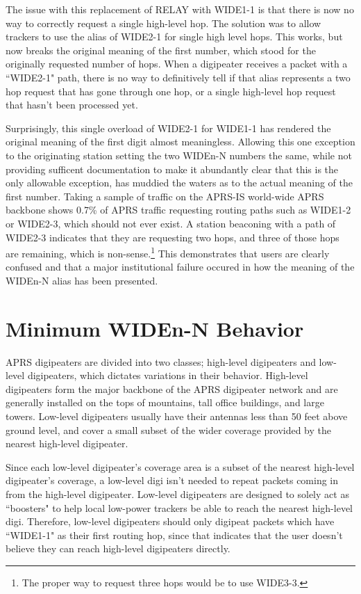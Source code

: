 The issue with this replacement of RELAY with WIDE1-1 is that there is now
no way to correctly request a single high-level hop.
The solution was to allow trackers to use the alias of WIDE2-1 for single
high level hops.
This works, but now breaks the original meaning of the first number,
which stood for the originally requested number of hops.
When a digipeater receives a packet with a ``WIDE2-1" path, 
there is no way to definitively
tell if that alias represents a two hop request that has gone through one hop,
or a single high-level hop request that hasn't been processed yet.

Surprisingly, this single overload of WIDE2-1 for WIDE1-1 has rendered the
original meaning of the first digit almost meaningless.
Allowing this one exception to the originating station setting the two WIDEn-N
numbers the same, while not providing sufficent documentation
to make it abundantly clear that this is the only allowable exception,
has muddied the waters as to the actual meaning of the first number.
Taking a sample of traffic on the APRS-IS world-wide APRS backbone shows
0.7\% of APRS traffic requesting routing paths such as WIDE1-2 or WIDE2-3,
which should not ever exist.
A station beaconing with a path of WIDE2-3 indicates that they are requesting
two hops, and three of those hops are remaining, which is non-sense.\footnote{The
proper way to request three hops would be to use WIDE3-3.}
This demonstrates that users are clearly confused and that a
major institutional failure occured in how the meaning of the WIDEn-N alias has
been presented.

\section{Minimum WIDEn-N Behavior}

APRS digipeaters are divided into two classes; high-level digipeaters and
low-level digipeaters, which dictates variations in their behavior.
High-level digipeaters form the major backbone of the APRS digipeater network
and are generally installed on the tops of mountains,
tall office buildings, and large towers.
Low-level digipeaters usually have their antennas less than 50 feet above ground
level, and cover a small subset of the wider coverage provided by the
nearest high-level digipeater.

Since each low-level digipeater's coverage area is a subset of the
nearest high-level digipeater's coverage, a low-level digi isn't needed
to repeat packets coming in from the high-level digipeater.
Low-level digipeaters are designed to solely act as ``boosters" to
help local low-power trackers be able to reach the nearest high-level digi.
Therefore, low-level digipeaters should only digipeat packets which
have ``WIDE1-1" as their first routing hop, since that indicates that
the user doesn't believe they can reach high-level digipeaters directly.

